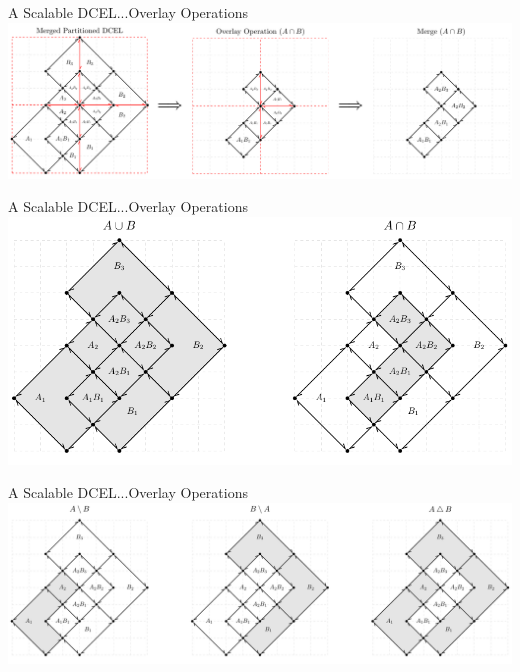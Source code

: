 \documentclass{beamer}
\begin{document}
\begin{frame}{A Scalable DCEL...}{Overlay Operations}
    \centering
	\includegraphics[width=1\textwidth]{figures/03-Overlays1/OverlayParted2}
\end{frame}

\begin{frame}{A Scalable DCEL...}{Overlay Operations}
    \centering
	\includegraphics[width=1\textwidth]{figures/04-Overlays2/OverlayOperations1}
\end{frame}
\begin{frame}{A Scalable DCEL...}{Overlay Operations}
    \centering
	\includegraphics[width=1\textwidth]{figures/04-Overlays2/OverlayOperations2}
\end{frame}
\end{document}
